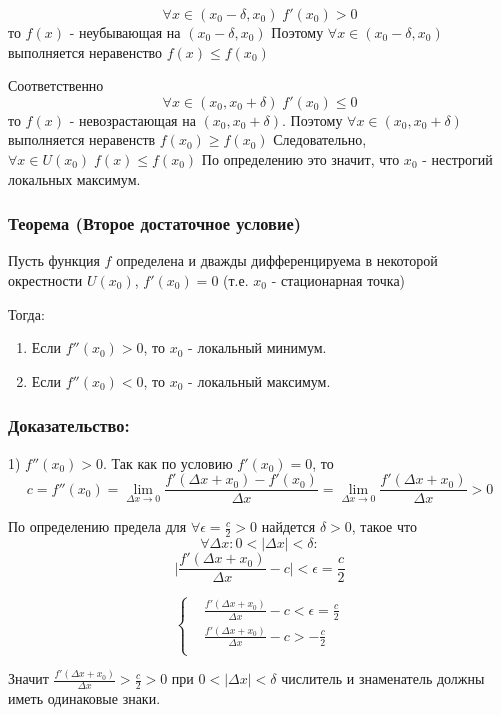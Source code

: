 \documentclass[a4paper,12pt]{article}
\theoremstyle{plain} %
\theoremstyle{definition} %
\theoremstyle{remark} %
\begin{document}
\[
	\forall x \in (x_0 - \delta, x_0) \;  f'(x_0) > 0
\]
то $f(x)$ - неубывающая на $(x_0 - \delta, x_0)$  Поэтому $\forall x \in (x_0 - \delta, x_0)$ выполняется неравенство $f(x) \leq f(x_0)$

Соответственно \[\forall x \in (x_0, x_0 + \delta) \; f'(x_0) \leq 0 \] то $f(x)$ - невозрастающая на $(x_0, x_0 + \delta)$. Поэтому $\forall x \in (x_0, x_0 + \delta)$ выполняется неравенств $f(x_0) \geq f(x_0)$
Следовательно, $\forall x \in U(x_0) \; f(x) \leq f(x_0)$
По определению это значит, что $x_0$ - нестрогий локальных максимум.

\subsubsection*{Теорема (Второе достаточное условие)}

Пусть функция $f$ определена и дважды дифференцируема в некоторой окрестности $U(x_0)$, $f'(x_0) = 0$ (т.е. $x_0$ - стационарная точка)

Тогда:
\begin{enumerate}
	\item Если $f''(x_0) > 0$, то $x_0$ - локальный минимум.
	\item Если $f''(x_0) < 0$, то $x_0$ - локальный максимум.
\end{enumerate}

\subsubsection*{Доказательство:}

1) $f''(x_0) > 0$. Так как по условию $f'(x_0) = 0$, то
\[ c = f''(x_0) = \lim_{\Delta x \rightarrow 0} \frac{f'(\Delta x + x_0) - f'(x_0)}{\Delta x} = \lim_{\Delta x \rightarrow 0} \frac{f'(\Delta x + x_0)}{\Delta x} > 0 \]

По определению предела для $\forall \epsilon = \frac{c}{2} > 0$ найдется $\delta > 0$, такое что
\[ \forall \Delta x: 0 < |\Delta x| < \delta : \]
\[ \Big| \frac{f'(\Delta x + x_0)}{\Delta x} - c \Big| < \epsilon = \frac{c}{2} \]

\[
	\begin{cases}
		 & \frac{f'(\Delta x + x_0)}{\Delta x} - c < \epsilon = \frac{c}{2} \\
		 & \frac{f'(\Delta x + x_0)}{\Delta x} - c > - \frac{c}{2}          \\
	\end{cases}
\]

Значит $\frac{f'(\Delta x + x_0)}{\Delta x} > \frac{c}{2} > 0$ при $0 < |\Delta x| < \delta$ числитель и знаменатель должны иметь одинаковые знаки.
\end{document}

